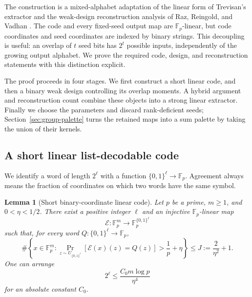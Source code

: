 \documentclass[11pt]{article}
\numberwithin{equation}{section}
\newtheorem{lemma}[theorem]{Lemma}
\theoremstyle{definition}
\theoremstyle{remark}
\newcommand{\F}{\mathbb F}
\begin{document}
The construction is a mixed-alphabet adaptation of the linear form of
Trevisan's extractor \cite{Trevisan2001} and the weak-design
reconstruction analysis of Raz, Reingold, and Vadhan \cite{RRV2002}.
The code and every fixed-seed output map are $\F_p$-linear, but code
coordinates and seed coordinates are indexed by binary strings.  This
decoupling is useful: an overlap of $t$ seed bits has $2^t$ possible inputs,
independently of the growing output alphabet.  We prove the required code,
design, and reconstruction statements with this distinction explicit.

The proof proceeds in four stages.  We first construct a short linear code,
and then a binary weak design controlling its overlap moments.  A hybrid
argument and reconstruction count combine these objects into a strong linear
extractor.  Finally we choose the parameters and discard rank-deficient seeds;
Section~\ref{sec:group-palette} turns the retained maps into a sum palette by
taking the union of their kernels.

\subsection{A short linear list-decodable code}

We identify a word of length $2^\ell$ with a function
$\{0,1\}^\ell\to\F_p$.  Agreement always means the fraction of coordinates
on which two words have the same symbol.

\begin{lemma}[Short binary-coordinate linear code]\label{lem:code}
Let $p$ be a prime, $m\ge1$, and $0<\eta<1/2$.  There exist a positive integer
$\ell$ and an injective $\F_p$-linear map
\[
 \mathcal E:\F_p^m\longrightarrow
 \F_p^{\{0,1\}^\ell}
\]
such that, for every word $Q:\{0,1\}^\ell\to\F_p$,
\[
 \#\left\{x\in\F_p^m:
 \Pr_{z\sim U_{\{0,1\}^\ell}}[\mathcal E(x)(z)=Q(z)]
 >\frac1p+\eta\right\}
 \le J:=\frac2{\eta^2}+1.
\]
One can arrange
\begin{equation}\label{eq:code-length}
 2^\ell\le \frac{C_0m\log p}{\eta^4}
\end{equation}
for an absolute constant $C_0$.
\end{lemma}
\end{document}
